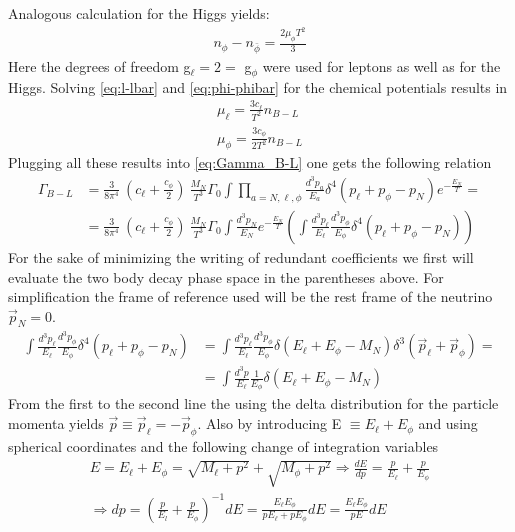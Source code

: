 Analogous calculation for the Higgs yields:
\begin{align*}
	n_\phi-n_{\bar{\phi}}=\frac{2\mu_\phi T^2}{3}
\end{align*}
Here the degrees of freedom g$_\ell=2=$ g$_\phi$ were used for leptons as well as for the Higgs. \newline
Solving \ref{eq:l-lbar} and \ref{eq:phi-phibar} for the chemical potentials results in
\begin{align*}
	\mu_\ell=\frac{3c_\ell}{T^2}n_{B-L}\\
	\mu_\phi=\frac{3c_\phi}{2T^2}n_{B-L}
\end{align*}
Plugging all these results into \ref{eq:Gamma_B-L} one gets the following relation
\begin{align*}
	\Gamma_{B-L}&=\frac{3}{8\pi^4}\:\left(c_\ell+\frac{c_\phi}{2}\right)\:\frac{M_N}{T^3}\Gamma_0\int\prod_{a=N,\ell,\phi}\frac{d^3p_a}{E_a}\delta^4\left(p_\ell+p_\phi-p_N\right)e^{-\frac{E_N}{T}}=\\
	&=\frac{3}{8\pi^4}\:\left(c_\ell+\frac{c_\phi}{2}\right)\:\frac{M_N}{T^3}\Gamma_0\int \frac{d^3p_N}{E_N}e^{-\frac{E_N}{T}}\left(\int\frac{d^3p_\ell}{E_\ell}\frac{d^3p_\phi}{E_\phi}\delta^4\left(p_\ell+p_\phi-p_N\right)\right)
\end{align*}
For the sake of minimizing the writing of redundant coefficients we first will evaluate the two body decay phase space in the parentheses above. For simplification the frame of reference used will be the rest frame of the neutrino $\vec{p}_N=0$.
\begin{align*}
\int\frac{d^3p_\ell}{E_\ell}\frac{d^3p_\phi}{E_\phi}\delta^4\left(p_\ell+p_\phi-p_N\right)&=\int\frac{d^3p_\ell}{E_\ell}\frac{d^3p_\phi}{E_\phi}\delta\left(E_\ell+E_\phi-M_N\right)\delta^3\left(\vec{p}_\ell+\vec{p}_\phi\right)=\\
&=\int\frac{d^3p}{E_\ell}\frac{1}{E_\phi}\delta\left(E_\ell+E_\phi-M_N\right)
\end{align*}
From the first to the second line the using the delta distribution for the particle momenta yields $\vec{p}\equiv\vec{p}_\ell=-\vec{p}_\phi$. Also by introducing E $\equiv E_\ell+E_\phi$ and using spherical coordinates and the following change of integration variables
\begin{align*}
	E=E_\ell+E_\phi=\sqrt{M_\ell+p^2}+\sqrt{M_\phi+p^2} \Longrightarrow \frac{dE}{dp}=\frac{p}{E_\ell}+\frac{p}{E_\phi} \\
	\Longrightarrow dp=\left(\frac{p}{E_l}+\frac{p}{E_\phi}\right)^{-1}dE=\frac{E_\ell E_\phi}{pE_\ell+pE_\phi}dE=\frac{E_\ell E_\phi}{pE}dE
\end{align*}
